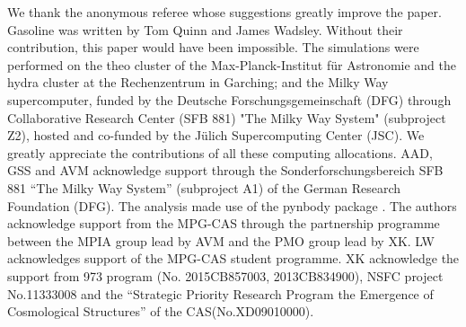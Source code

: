 \documentclass[useAMS,usenatbib]{mn2e}
\begin{document}
We thank the anonymous referee whose suggestions greatly 
improve the paper.
{\sc Gasoline} was written by Tom Quinn and James Wadsley. Without
their contribution, this paper would have been impossible.
%
The simulations were performed on the {\sc theo} cluster of the
Max-Planck-Institut f\"ur Astronomie and the {\sc hydra} cluster at
the Rechenzentrum in Garching; and the Milky Way supercomputer, funded
by the Deutsche Forschungsgemeinschaft (DFG) through Collaborative
Research Center (SFB 881) "The Milky Way System" (subproject Z2),
hosted and co-funded by the J\"ulich Supercomputing Center (JSC). We
greatly appreciate the contributions of all these computing
allocations.
%
AAD, GSS and AVM acknowledge support through the
Sonderforschungsbereich SFB 881 “The Milky Way System” (subproject A1)
of the German Research Foundation (DFG).  The analysis made use of the
pynbody package \citep{Pontzen13}.
%
The authors acknowledge support from the MPG-CAS through the
partnership programme between the MPIA group lead by AVM and the PMO
group lead by XK.
%
LW acknowledges support of the MPG-CAS student programme.
%
XK acknowledge the support from 973 program (No. 2015CB857003,
2013CB834900), NSFC project No.11333008 and the ``Strategic Priority
Research Program the Emergence of Cosmological Structures'' of the
CAS(No.XD09010000).


\end{document}
